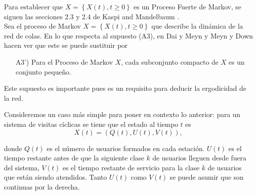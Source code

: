 Para establecer que $X=\left\{X\left(t\right),t\geq0\right\}$ es
un Proceso Fuerte de Markov, se siguen las secciones 2.3 y 2.4 de Kaspi and Mandelbaum \cite{KaspiMandelbaum}. \\


Sea el proceso de Markov $X=\left\{X\left(t\right),t\geq0\right\}$
que describe la din\'amica de la red de colas. En lo que respecta
al supuesto (A3), en Dai y Meyn \cite{DaiSean} y Meyn y Down
\cite{MeynDown} hacen ver que este se puede sustituir por

\begin{itemize}
\item[A3')] Para el Proceso de Markov $X$, cada subconjunto
compacto de $X$ es un conjunto peque\~no.
\end{itemize}

Este supuesto es importante pues es un requisito para deducir la ergodicidad de la red.


Consideremos un caso m\'as simple para poner en contexto lo
anterior: para un sistema de visitas c\'iclicas se tiene que el
estado al tiempo $t$ es
\begin{equation}
X\left(t\right)=\left(Q\left(t\right),U\left(t\right),V\left(t\right)\right),
\end{equation}

donde $Q\left(t\right)$ es el n\'umero de usuarios formados en
cada estaci\'on. $U\left(t\right)$ es el tiempo restante antes de
que la siguiente clase $k$ de usuarios lleguen desde fuera del
sistema, $V\left(t\right)$ es el tiempo restante de servicio para
la clase $k$ de usuarios que est\'an siendo atendidos. Tanto
$U\left(t\right)$ como $V\left(t\right)$ se puede asumir que son
continuas por la derecha.

